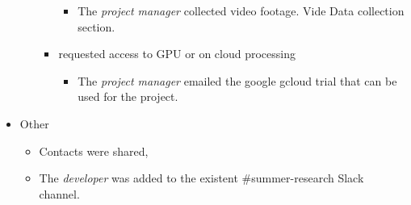 \documentclass{article}
\begin{document}
\begin{itemize}
\begin{itemize}
\begin{itemize}
\begin{itemize}
\item The \emph{project manager} collected video footage. Vide Data collection section.
\end{itemize}
\item requested access to GPU or on cloud processing
\begin{itemize}
\item The \emph{project manager} emailed the google gcloud trial that can be used for the project.
\end{itemize}
\end{itemize}
\end{itemize}
\item Other
\begin{itemize}
\item Contacts were shared,

\item The \emph{developer} was added to the existent \#summer-research Slack channel.
\end{itemize}
\end{itemize}
\end{document}

